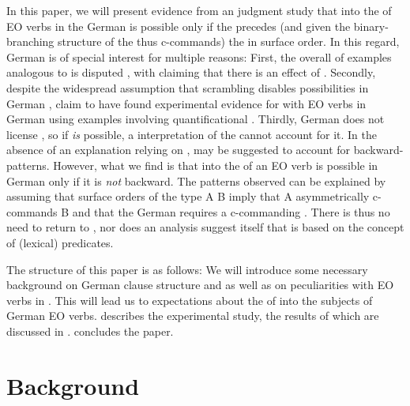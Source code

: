 \documentclass[output=paper,colorlinks,citecolor=brown]{langscibook}
\begin{document}
In this paper, we will present evidence from an  judgment study that  into the  of EO verbs in the German  is possible only if the  precedes (and given the binary-branching structure of the  thus c-commands) the  in surface order.
In this regard, German is of special interest for multiple reasons:  
First, the overall  of examples analogous to  is disputed \citep[cf.][]{kiss_reflexivity_2012,platzack_backward_2012,fischer_theories_2015,temme_backward_2017}, with \citet{fischer_theories_2015} claiming that there is an effect of . 
Secondly, despite the widespread assumption that scrambling disables  possibilities in German \citep[and enables new ones, see e.g.][]{haider_mittelfeld_2017}, \citet{temme_backward_2017} claim to have found experimental evidence for  with EO verbs in German using examples involving quantificational .
Thirdly, German does not license   \citep{kiss_reflexivity_2012}, so if  \emph{is} possible, a  interpretation of the  cannot account for it.
In the absence of an explanation relying on ,  may be suggested to account for backward- patterns. 
However, what we find is that  into the  of an EO verb is possible in German only if it is \emph{not} backward. 
The patterns observed can be explained by assuming that surface orders of the type A B imply that A asymmetrically c-commands B and that the German   requires a c-commanding .
There is thus no need to return to , nor does an analysis suggest itself that is based on the concept of (lexical) predicates.

The structure of this paper is as follows: We will introduce some necessary background on German clause structure and  as well as on  peculiarities with EO verbs in .
This will lead us to expectations about the  of   into the subjects of German EO verbs.
 describes the experimental study, the results of which are discussed in .
 concludes the paper.

\section{Background}
\label{sec:background:Masloch}
\end{document}
